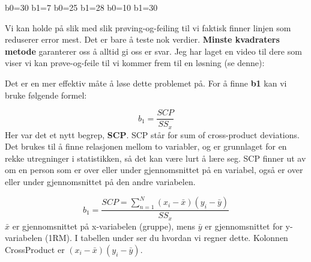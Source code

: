 \documentclass[
]{book}
\begin{document}
b0=30 b1=7 b0=25 b1=28 b0=10 b1=30

Vi kan holde på slik med slik prøving-og-feiling til vi faktisk finner linjen som reduserer error mest. Det er bare å teste nok verdier. \textbf{Minste kvadraters metode} garanterer oss å alltid gi oss er svar. Jeg har laget en video til dere som viser vi kan prøve-og-feile til vi kommer frem til en løsning (se denne):

Det er en mer effektiv måte å løse dette problemet på. For å finne \textbf{b1} kan vi bruke følgende formel:

\[ b_1 = \frac{SCP}{SS_x} \]
Her var det et nytt begrep, \textbf{SCP}. SCP står for sum of cross-product deviations. Det brukes til å finne relasjonen mellom to variabler, og er grunnlaget for en rekke utregninger i statistikken, så det kan være lurt å lære seg. SCP finner ut av om en person som er over eller under gjennomsnittet på en variabel, også er over eller under gjennomsnittet på den andre variabelen.

\[ b_1 = \frac{SCP = \sum_{n=1}^N (x_i - \bar{x})(y_i - \bar{y})}{SS_x} \]
\(\bar{x}\) er gjennomsnittet på x-variabelen (gruppe), mens \(\bar{y}\) er gjennomsnittet for y-variabelen (1RM). I tabellen under ser du hvordan vi regner dette. Kolonnen CrossProduct er \((x_i - \bar{x})(y_i - \bar{y})\).
\end{document}
